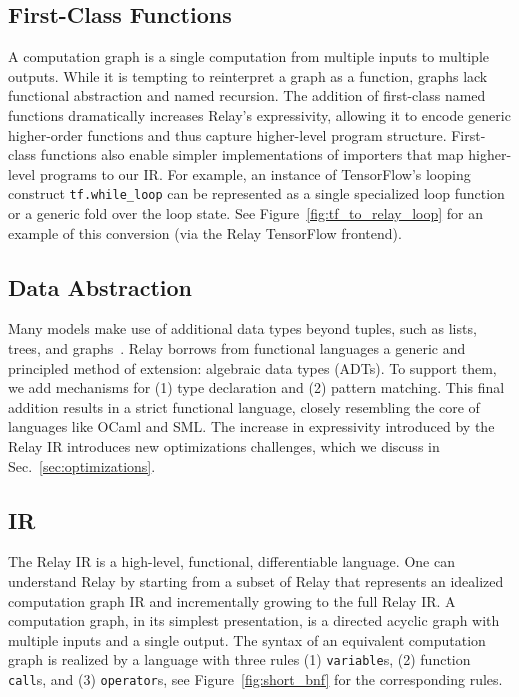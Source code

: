 \subsection*{First-Class Functions}

A computation graph is a single computation
  from multiple inputs to multiple outputs.
While it is tempting to reinterpret a graph as a function,
  graphs lack functional abstraction and named recursion.
The addition of first-class named functions dramatically increases
  Relay's expressivity, allowing it to encode generic
  higher-order functions and thus capture higher-level program structure.
First-class functions also enable simpler implementations
  of importers that map higher-level programs to our IR.
For example, an instance of TensorFlow's looping construct \verb|tf.while_loop|
  can be represented as a single specialized loop function
  or a generic fold over the loop state.
See Figure~\ref{fig:tf_to_relay_loop} for an example of this conversion (via
  the Relay TensorFlow frontend).

\subsection*{Data Abstraction}
Many models make use of additional data types beyond
  tuples, such as lists, trees, and graphs~\citep{char-rnn, tree_lstm, graph_lstm}.
Relay borrows from functional languages
  a generic and principled method of extension:
  algebraic data types (ADTs).
To support them, we add mechanisms for
  (1) type declaration and
  (2) pattern matching.
This final addition results in a strict functional language,
  closely resembling the core of languages like OCaml and SML.
The increase in expressivity introduced by the Relay IR introduces
  new optimizations challenges, which we
  discuss in Sec.~\ref{sec:optimizations}.


  \subsection{IR}
  

  The Relay IR is a high-level, functional, differentiable language.
  One can understand Relay by starting from a subset of Relay
    that represents an idealized computation graph IR and
    incrementally growing to the full Relay IR.
  A computation graph, in its simplest presentation, is a directed acyclic
    graph with multiple inputs and a single output.
  The syntax of an equivalent computation graph is realized by
    a language with three rules (1) \verb|variable|s, (2) function \verb|call|s,
    and (3) \verb|operator|s, see Figure~\ref{fig:short_bnf} for the corresponding rules.

